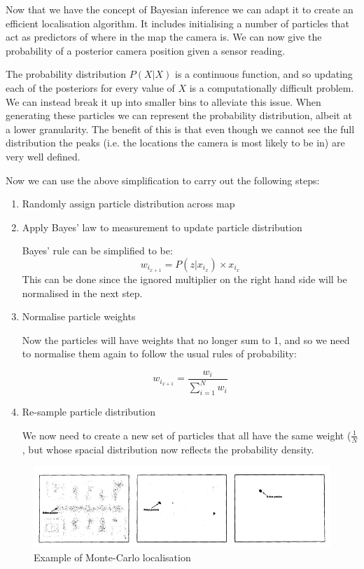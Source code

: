 Now that we have the concept of Bayesian inference we can adapt it to create an efficient localisation algorithm. It includes initialising a number of particles that act as predictors of where in the map the camera is. We can now give the probability of a posterior camera position given a sensor reading.

The probability distribution $ P(X|X) $ is a continuous function, and so updating each of the posteriors for every value of $ X $ is a computationally difficult problem. We can instead break it up into smaller bins to alleviate this issue. When generating these particles we can represent the probability distribution, albeit at a lower granularity. The benefit of this is that even though we cannot see the full distribution the peaks (i.e. the locations the camera is most likely to be in) are very well defined.

Now we can use the above simplification to carry out the following steps:

\begin{enumerate}
      \item Randomly assign particle distribution across map
      \item Apply Bayes' law to measurement to update particle distribution

            Bayes' rule can be simplified to be:
            $$ w_{i_{x+1}} = P(z|x_{i_x}) \times x_{i_x} $$
            This can be done since the ignored multiplier on the right hand side will be normalised in the next step.
      \item Normalise particle weights

            Now the particles will have weights that no longer sum to 1, and so we need to normalise them again to follow the usual rules of probability:

            $$ w_{i_{x+1}} = \frac{w_i}{\sum^N_{i=1}w_i} $$
      \item Re-sample particle distribution

            We now need to create a new set of particles that all have the same weight ($ \frac{1}{N} $, but whose spacial distribution now reflects the probability density.
\end{enumerate}

\begin{figure}[htb]
      \centering
      \includegraphics[width=\textwidth]{background/images/monte_carlo.png}
      \caption{Example of Monte-Carlo localisation\cite{MonteCarloLocalisation}}
      \label{fig:monte_carlo}
\end{figure}

